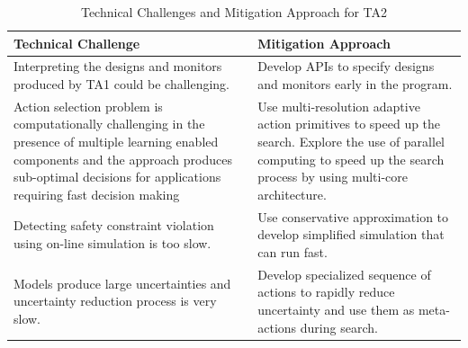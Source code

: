 \begin{table}[ht]
\caption{Technical Challenges and Mitigation Approach for TA2}
  \centering
  
{\footnotesize
\begin{tabular}{|m{2.7in}|m{3.45in}|} 
\hline
\textbf{Technical Challenge} & \textbf{Mitigation Approach} 
\\\hline
Interpreting the designs and monitors produced by TA1 could be challenging.  &   Develop APIs to specify designs and monitors  early in the program.\\ \hline
Action selection problem is computationally challenging in the presence of multiple learning enabled components and the approach produces sub-optimal decisions for applications requiring fast decision making &  Use multi-resolution adaptive action primitives to speed up the search.  Explore the use of parallel computing to speed up the search process by using multi-core architecture.\\ \hline
Detecting safety constraint violation using on-line simulation is too slow.
 & 
Use conservative approximation to develop simplified simulation that can run fast.
\\ \hline
Models produce large uncertainties and uncertainty reduction process is very slow. & 
Develop specialized sequence of actions to rapidly  reduce uncertainty  and use them as meta-actions during search. \\
\hline
\end{tabular}
}
\end{table}


